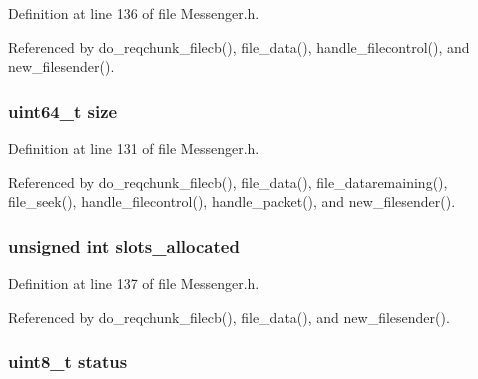 Definition at line 136 of file Messenger.\+h.



Referenced by do\+\_\+reqchunk\+\_\+filecb(), file\+\_\+data(), handle\+\_\+filecontrol(), and new\+\_\+filesender().

\hypertarget{struct_file___transfers_af931a8871310b4dad23f0f0b0f623560}{
\subsubsection[{size}]{\setlength{\rightskip}{0pt plus 5cm}uint64\+\_\+t size}}\label{struct_file___transfers_af931a8871310b4dad23f0f0b0f623560}


Definition at line 131 of file Messenger.\+h.



Referenced by do\+\_\+reqchunk\+\_\+filecb(), file\+\_\+data(), file\+\_\+dataremaining(), file\+\_\+seek(), handle\+\_\+filecontrol(), handle\+\_\+packet(), and new\+\_\+filesender().

\hypertarget{struct_file___transfers_ae5c1661a0e1ed999ed054d837989556b}{
\subsubsection[{slots\+\_\+allocated}]{\setlength{\rightskip}{0pt plus 5cm}unsigned int slots\+\_\+allocated}}\label{struct_file___transfers_ae5c1661a0e1ed999ed054d837989556b}


Definition at line 137 of file Messenger.\+h.



Referenced by do\+\_\+reqchunk\+\_\+filecb(), file\+\_\+data(), and new\+\_\+filesender().

\hypertarget{struct_file___transfers_ade818037fd6c985038ff29656089758d}{
\subsubsection[{status}]{\setlength{\rightskip}{0pt plus 5cm}uint8\+\_\+t status}}\label{struct_file___transfers_ade818037fd6c985038ff29656089758d}


